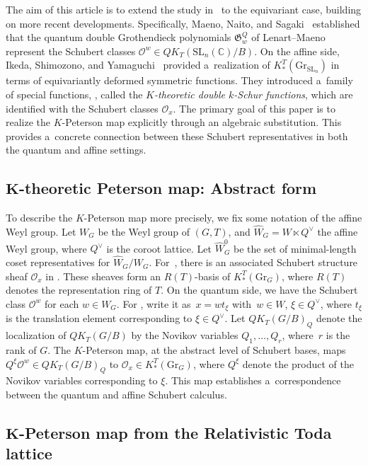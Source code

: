 \documentclass[pdftex]{sigma}
\numberwithin{equation}{section}
\newcommand{\C}{\mathbb{C}}
\newcommand{\Gr}{\mathrm{Gr}}
\newcommand{\Gro}[1]{\mathfrak{G}^Q_{#1}}
\newcommand{\Rep}{{R(T)}}
\newcommand{\SL}{\mathrm{SL}}
\theoremstyle{definition}
\begin{document}
The aim of this article is to extend the study in~\cite{IIM} to the equivariant case, building on more recent developments. Specifically,
Maeno, Naito, and Sagaki~\cite{MNS1,MNS2} established that the quantum double Grothendieck polynomials $\Gro{w}$ of Lenart--Maeno represent the Schubert classes $\mathscr{O}^w\in QK_T(\SL_n(\C)/B)$.
On the affine side, Ikeda, Shimozono, and Yamaguchi~\cite{ISY} provided a~realization of $K_*^T(\Gr_{\SL_n})$ in terms of equivariantly deformed symmetric functions.
They introduced a~family of special functions, , called the \emph{$K$-theoretic double $k$-Schur functions}, which are identified with the Schubert classes $\mathscr{O}_x$.
The primary goal of this paper is to realize the $K$-Peterson map explicitly through an algebraic substitution.
This provides a~concrete connection between these Schubert representatives in both the quantum and affine settings.

\subsection[K-theoretic Peterson map: abstract form]{$\boldsymbol{K}$-theoretic Peterson map: Abstract form}
To describe the $K$-Peterson map more precisely, we fix some notation of the affine Weyl group.
Let $W_G$ be the Weyl group of $(G,T)$, and $\hat{W}_G=W\ltimes Q^\vee$ the affine Weyl group,
 where $Q^\vee$ is the coroot lattice.
 Let $\hat{W}_G^0$ be the set of minimal-length coset representatives for
 $\hat{W}_G/W_G$. For~, there is
 an associated Schubert structure sheaf $\mathscr{O}_x$ in \smash{$K_*^T(\Gr_{G})$}.
 These sheaves form an $\Rep$-basis of $K_*^T(\Gr_{G})$, where $\Rep$ denotes the representation ring of $T$.
On the quantum side, we have the Schubert class $\mathscr{O}^w$ for each $w\in W_G$.
 For ,
 write it as~${x=wt_\xi}$ with~${w\in W}$, $\xi\in Q^\vee$,
 where $t_\xi$ is the translation element corresponding to $\xi\in Q^\vee$.
 Let $QK_T(G/B)_Q$ denote the localization of $QK_T(G/B)$ by
 the Novikov variables $Q_1,\dots,Q_r$, where~$r$ is the rank of $G$.
 The $K$-Peterson map, at the abstract level of Schubert bases,
maps $Q^\xi\mathscr{O}^w \in QK_T(G/B)_Q$ to $\mathscr{O}_{x}\in K_*^T(\Gr_G)$, where $Q^\xi$ denote the product of the Novikov variables corresponding to $\xi$. This map establishes a~correspondence between the quantum and affine Schubert calculus.

\subsection[K-Peterson map from the Relativistic Toda lattice]{$\boldsymbol{K}$-Peterson map from the Relativistic Toda lattice}
\end{document}
